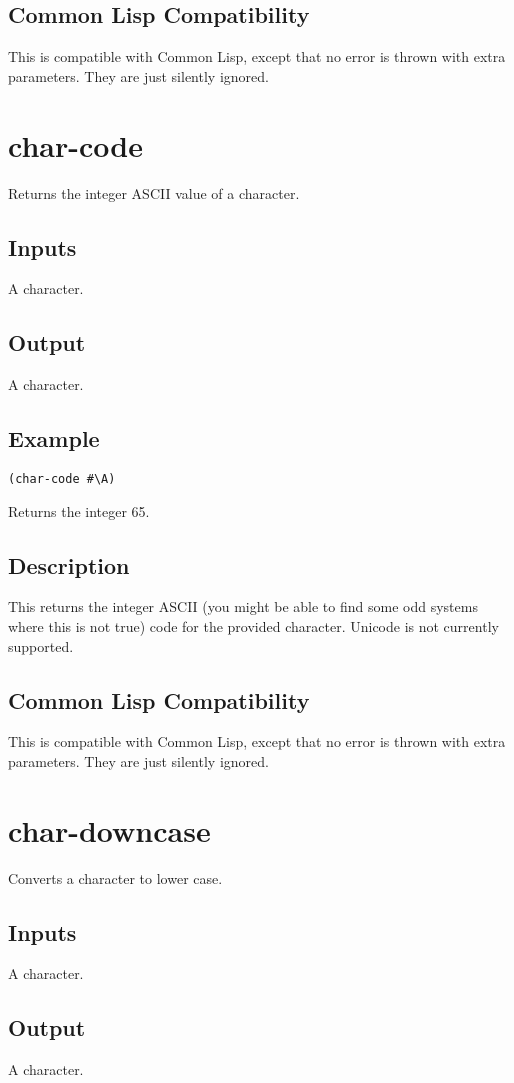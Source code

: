 \documentclass[10pt, openany]{book}
\newcommand{\cl}{Common Lisp}
\begin{document}
\subsection{Common Lisp Compatibility}
This is compatible with \cl, except that no error is thrown with extra parameters.  They are just silently ignored.

\section{char-code}
Returns the integer ASCII value of a character.
\subsection{Inputs}
A character.
\subsection{Output}
A character.
\subsection{Example}
\begin{lstlisting}
(char-code #\A)
\end{lstlisting}
Returns the integer 65.
\subsection{Description}
This returns the integer ASCII (you might be able to find some odd systems where this is not true) code for the provided character.  Unicode is not currently supported.
\subsection{Common Lisp Compatibility}
This is compatible with \cl, except that no error is thrown with extra parameters.  They are just silently ignored.

\section{char-downcase}
Converts a character to lower case.
\subsection{Inputs}
A character.
\subsection{Output}
A character.
\end{document}
